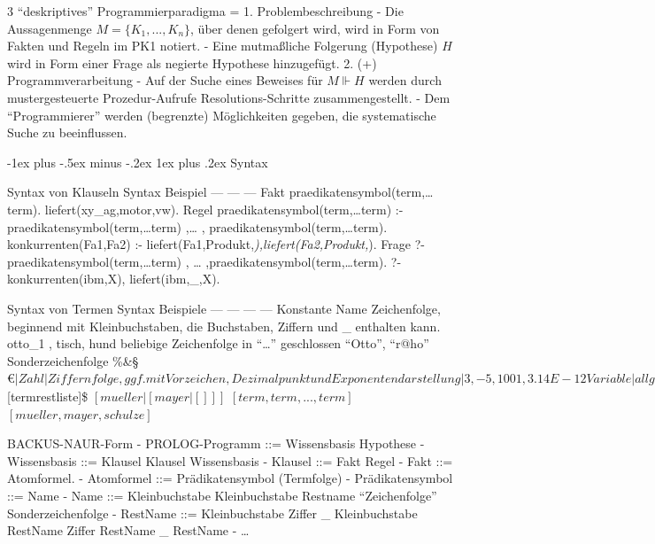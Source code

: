 \documentclass[a4paper]{article}
\makeatletter
\renewcommand{\subsubsection}{\@startsection{subsubsection}{3}{0mm}%
                {-1ex plus -.5ex minus -.2ex}%
                {1ex plus .2ex}%
                {\normalfont\small\bfseries}}
\makeatother
\begin{document}
\begin{multicols}{3}
  ``deskriptives'' Programmierparadigma = 1. Problembeschreibung - Die
  Aussagenmenge $M =\{K_1,...,K_n\}$, über denen gefolgert wird, wird in
  Form von Fakten und Regeln im PK1 notiert. - Eine mutmaßliche Folgerung
  (Hypothese) $H$ wird in Form einer Frage als negierte Hypothese
  hinzugefügt. 2. (+) Programmverarbeitung - Auf der Suche eines Beweises
  für $M \Vdash H$ werden durch mustergesteuerte Prozedur-Aufrufe
  Resolutions-Schritte zusammengestellt. - Dem ``Programmierer'' werden
  (begrenzte) Möglichkeiten gegeben, die systematische Suche zu
  beeinflussen.

  \subsubsection{Syntax}\label{syntax}

  Syntax von Klauseln \textbar{} \textbar{} Syntax \textbar{} Beispiel
  \textbar{} --- \textbar{} --- \textbar{} --- \textbar{} Fakt \textbar{}
  praedikatensymbol(term,\ldots{}term). \textbar{}
  liefert(xy\_ag,motor,vw). Regel \textbar{}
  praedikatensymbol(term,\ldots{}term) :-
  praedikatensymbol(term,\ldots{}term) ,\ldots{} ,
  praedikatensymbol(term,\ldots{}term). \textbar{} konkurrenten(Fa1,Fa2)
  :- liefert(Fa1,Produkt,\emph{),liefert(Fa2,Produkt,}). Frage \textbar{}
  ?- praedikatensymbol(term,\ldots{}term) , \ldots{}
  ,praedikatensymbol(term,\ldots{}term). \textbar{} ?-
  konkurrenten(ibm,X), liefert(ibm,\_,X).

  Syntax von Termen \textbar{} \textbar{} \textbar{} Syntax \textbar{}
  Beispiele \textbar{} \textbar{} --- \textbar{} --- \textbar{} ---
  \textbar{} --- \textbar{} Konstante \textbar{} Name \textbar{}
  Zeichenfolge, beginnend mit Kleinbuchstaben, die Buchstaben, Ziffern und
  \_ enthalten kann. \textbar{} otto\_1 , tisch, hund \textbar{}\textbar{}
  beliebige Zeichenfolge in ``\ldots{}'' geschlossen \textbar{} ``Otto'',
  ``r@ho'' \textbar{}\textbar{} Sonderzeichenfolge \textbar{}
  \%\&§$€ | Zahl | Ziffernfolge, ggf. mit Vorzeichen, Dezimalpunkt und Exponentendarstellung | 3, -5, 1001, 3.14E-12 Variable | allg. | Zeichenfolge, mit Großbuchstaben oder \_ beginnend | X, Was, _alter | anonym | Unterstrich | \_ strukturierter Term | allg. | funktionssymbol( term , ... , term ) | nachbar(chef(X)) | Liste | leere Liste | [ ] | | ${[}term\textbar{}restliste{]}\$
  \textbar{} $[mueller|[mayer|[]]]$ \textbar{}\textbar{}
  $[term , term , ... , term ]$ \textbar{} $[ mueller, mayer, schulze ]$

  BACKUS-NAUR-Form - PROLOG-Programm ::= Wissensbasis Hypothese -
  Wissensbasis ::= Klausel \textbar{} Klausel Wissensbasis - Klausel ::=
  Fakt \textbar{} Regel - Fakt ::= Atomformel. - Atomformel ::=
  Prädikatensymbol (Termfolge) - Prädikatensymbol ::= Name - Name ::=
  Kleinbuchstabe \textbar{}Kleinbuchstabe Restname \textbar{}
  ``Zeichenfolge'' \textbar{} Sonderzeichenfolge - RestName ::=
  Kleinbuchstabe \textbar{} Ziffer \textbar{} \_ \textbar{} Kleinbuchstabe
  RestName \textbar{} Ziffer RestName \textbar{} \_ RestName - \ldots{}


\end{multicols}
\end{document}
